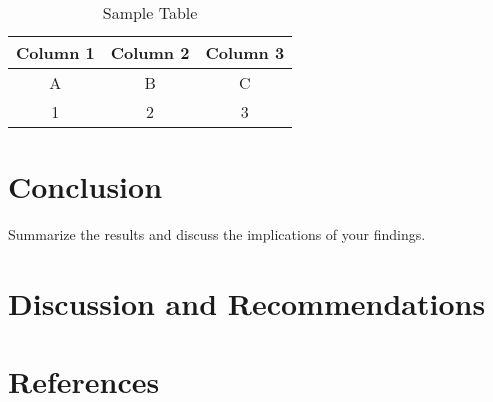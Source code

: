 \documentclass[a4paper,12pt]{article}
\begin{document}
\begin{table}[H]
    \centering
    \begin{tabular}{|c|c|c|}
        \hline
        Column 1 & Column 2 & Column 3 \\
        \hline
        A & B & C \\
        1 & 2 & 3 \\
        \hline
    \end{tabular}
    \caption{Sample Table}
    \label{tab:sample-table}
\end{table}

\section{Conclusion}
Summarize the results and discuss the implications of your findings.

\section{Discussion and Recommendations}

\section*{References}
\end{document}
